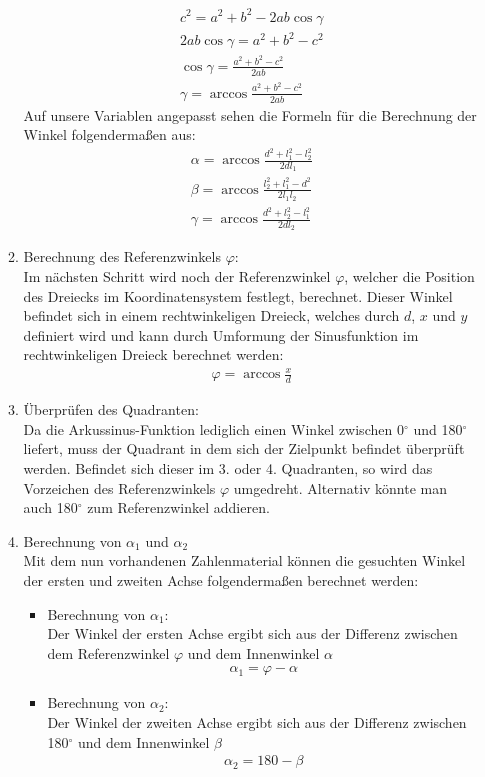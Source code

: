 \begin{itemize}
\begin{enumerate}
\begin{align*}
c^2 = a^2 + b^2 - 2ab \cos \gamma \\
2ab \cos \gamma = a^2 + b^2 - c^2 \\
\cos \gamma = \frac{a^2 + b^2 - c^2}{2ab} \\
\gamma = \arccos \frac{a^2 + b^2 - c^2}{2ab}
\end{align*}
Auf unsere Variablen angepasst sehen die Formeln für die Berechnung der Winkel folgendermaßen aus:
\begin{align*}
\alpha = \arccos \frac{d^2 + l_1^2 - l_2^2}{2dl_1} \\
\beta = \arccos \frac{l_2^2 + l_1^2 - d^2}{2l_1l_2} \\
\gamma = \arccos \frac{d^2 + l_2^2 - l_1^2}{2dl_2}
\end{align*}
\newpage
\item Berechnung des Referenzwinkels $\varphi$:\\
Im nächsten Schritt wird noch der Referenzwinkel $\varphi$, welcher die Position des Dreiecks im Koordinatensystem festlegt, berechnet. Dieser Winkel befindet sich in einem rechtwinkeligen Dreieck, welches durch $d$, $x$ und $y$ definiert wird und kann durch Umformung der Sinusfunktion im rechtwinkeligen Dreieck berechnet werden:
\begin{align*}
\varphi = \arccos \frac{x}{d}
\end{align*}
\item Überprüfen des Quadranten:\\
Da die Arkussinus-Funktion lediglich einen Winkel zwischen 0$^\circ$ und 180$^\circ$ liefert, muss der Quadrant in dem sich der Zielpunkt befindet überprüft werden. Befindet sich dieser im 3. oder 4. Quadranten, so wird das Vorzeichen des Referenzwinkels $\varphi$ umgedreht. Alternativ könnte man auch 180$^\circ$ zum Referenzwinkel addieren.
\item Berechnung von $\alpha_1$ und $\alpha_2$\\
Mit dem nun vorhandenen Zahlenmaterial können die gesuchten Winkel der ersten und zweiten Achse folgendermaßen berechnet werden:
\begin{itemize}
\item Berechnung von $\alpha_1$:\\
Der Winkel der ersten Achse ergibt sich aus der Differenz zwischen dem Referenzwinkel $\varphi$ und dem Innenwinkel $\alpha$
\begin{align*}
\alpha_1 = \varphi - \alpha
\end{align*}
\item Berechnung von $\alpha_2$:\\
Der Winkel der zweiten Achse ergibt sich aus der Differenz zwischen 180$^\circ$ und dem Innenwinkel $\beta$
\begin{align*}
\alpha_2 = 180 - \beta
\end{align*}
\end{itemize}

\end{enumerate}
\end{itemize}